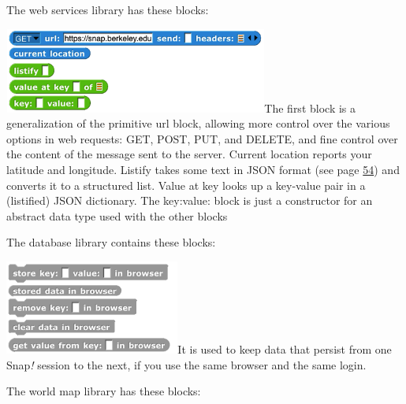 The web services library has these blocks:

\includegraphics[width=3.40972in,height=1.10417in]{media/image471.png}The
first block is a generalization of the primitive url block, allowing
more control over the various options in web requests: GET, POST, PUT,
and DELETE, and fine control over the content of the message sent to the
server. Current location reports your latitude and longitude. Listify
takes some text in JSON format (see page
\hyperref[multi-dimensional-lists-and-json]{54}) and converts it to a
structured list. Value at key looks up a key-value pair in a (listified)
JSON dictionary. The key:value: block is just a constructor for an
abstract data type used with the other blocks

The database library contains these blocks:

\includegraphics[width=2.26389in,height=1.22222in]{media/image472.png}It
is used to keep data that persist from one Snap\emph{!} session to the
next, if you use the same browser and the same login.

The world map library has these blocks:

